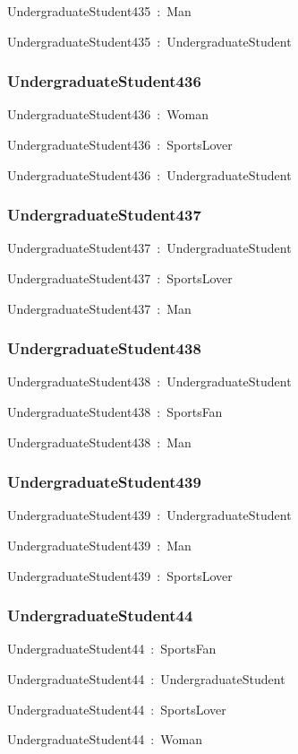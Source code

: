 \documentclass{article}
\begin{document}
UndergraduateStudent435~:~Man

UndergraduateStudent435~:~UndergraduateStudent

\subsubsection*{UndergraduateStudent436}

UndergraduateStudent436~:~Woman

UndergraduateStudent436~:~SportsLover

UndergraduateStudent436~:~UndergraduateStudent

\subsubsection*{UndergraduateStudent437}

UndergraduateStudent437~:~UndergraduateStudent

UndergraduateStudent437~:~SportsLover

UndergraduateStudent437~:~Man

\subsubsection*{UndergraduateStudent438}

UndergraduateStudent438~:~UndergraduateStudent

UndergraduateStudent438~:~SportsFan

UndergraduateStudent438~:~Man

\subsubsection*{UndergraduateStudent439}

UndergraduateStudent439~:~UndergraduateStudent

UndergraduateStudent439~:~Man

UndergraduateStudent439~:~SportsLover

\subsubsection*{UndergraduateStudent44}

UndergraduateStudent44~:~SportsFan

UndergraduateStudent44~:~UndergraduateStudent

UndergraduateStudent44~:~SportsLover

UndergraduateStudent44~:~Woman
\end{document}

